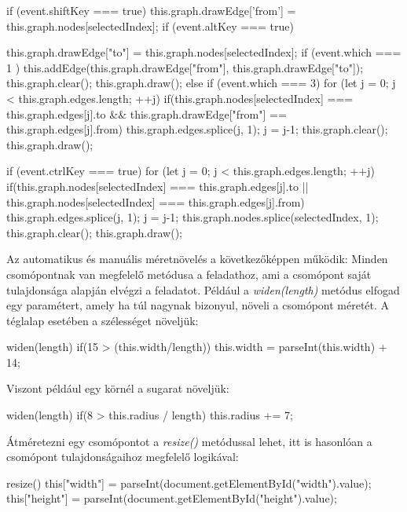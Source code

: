 \begin{javascript}
if (event.shiftKey === true) {
    this.graph.drawEdge['from'] = this.graph.nodes[selectedIndex];
}
if (event.altKey === true) {
    this.graph.drawEdge["to"] = this.graph.nodes[selectedIndex];
    if (event.which === 1 ){
        this.addEdge(this.graph.drawEdge["from"], this.graph.drawEdge["to"]);
        this.graph.clear();
        this.graph.draw();
    } else if (event.which === 3){
        for (let j = 0; j < this.graph.edges.length; ++j) {
            if(this.graph.nodes[selectedIndex] === this.graph.edges[j].to && this.graph.drawEdge["from"] == this.graph.edges[j].from)
            {
                this.graph.edges.splice(j, 1);
                j = j-1;
                this.graph.clear();
                this.graph.draw();
            }
        }
    }

}
if (event.ctrlKey === true) {
    for (let j = 0; j < this.graph.edges.length; ++j) {
        if(this.graph.nodes[selectedIndex] === this.graph.edges[j].to || this.graph.nodes[selectedIndex] === this.graph.edges[j].from)
        {
            this.graph.edges.splice(j, 1);
            j = j-1;
        }
    }
    this.graph.nodes.splice(selectedIndex, 1);
    this.graph.clear();
    this.graph.draw();
}
\end{javascript}

Az automatikus és manuális méretnövelés a következőképpen működik: Minden csomópontnak van megfelelő metódusa a feladathoz, ami a csomópont saját tulajdonsága alapján elvégzi a feladatot. Például a \textit{widen(length)} metódus elfogad egy paramétert, amely ha túl nagynak bizonyul, növeli a csomópont méretét. A téglalap esetében a szélességet növeljük:

\begin{javascript}
widen(length){
   if(15 > (this.width/length))
   {
       this.width = parseInt(this.width) + 14;
   }
}
\end{javascript}

Viszont például egy körnél a sugarat növeljük:

\begin{javascript}
widen(length){
   if(8 > this.radius / length)
   {
       this.radius += 7;
   }
}
\end{javascript}

Átméretezni egy csomópontot a \textit{resize()} metódussal lehet, itt is hasonlóan a csomópont tulajdonságaihoz megfelelő logikával:

\begin{javascript}
resize(){
   this["width"] = parseInt(document.getElementById("width").value);
   this["height"] =  parseInt(document.getElementById("height").value);
}
\end{javascript}

